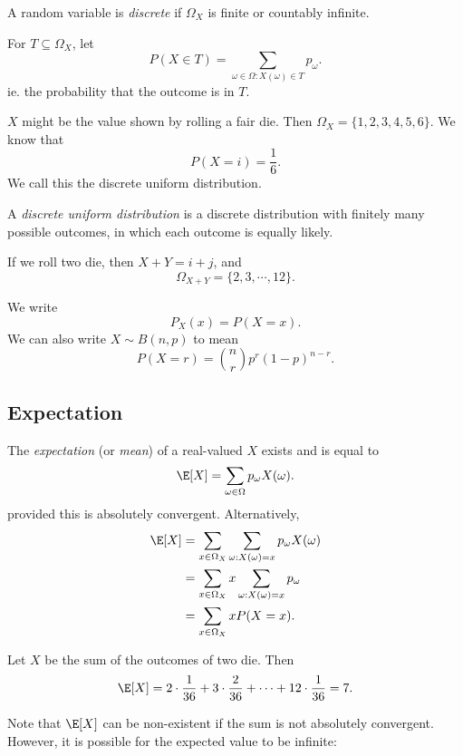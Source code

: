 \documentclass[a4paper]{article}
\begin{document}
\begin{defi}
  A random variable is \emph{discrete} if $\Omega_X$ is finite or countably infinite.
\end{defi}

\begin{notation}
  For $T\subseteq \Omega_X$, let
  \[
    P(X\in T) = \sum_{\omega \in \Omega: X(\omega)\in T}p_\omega.
  \]
  ie. the probability that the outcome is in $T$.
\end{notation}

\begin{eg}
  $X$ might be the value shown by rolling a fair die. Then $\Omega_X = \{1, 2, 3, 4, 5, 6\}$. We know that
  \[
    P(X = i) = \frac{1}{6}.
  \]
  We call this the discrete uniform distribution.
\end{eg}
\begin{defi}
  A \emph{discrete uniform distribution} is a discrete distribution with finitely many possible outcomes, in which each outcome is equally likely.
\end{defi}

\begin{eg}
  If we roll two die, then $X + Y = i + j$, and
  \[
    \Omega_{X + Y} = \{2, 3, \cdots, 12\}.
  \]
\end{eg}

\begin{notation}
  We write
  \[
    P_X(x) = P(X = x).
  \]
  We can also write $X\sim B(n, p)$ to mean
  \[
    P(X = r) = \binom{n}{r}p^r(1 - p)^{n - r}.
  \]
\end{notation}

\subsection{Expectation}
\begin{defi}[Expectation]
  The \emph{expectation} (or \emph{mean}) of a real-valued $X$ exists and is equal to
  \[
    \E[X] = \sum_{\omega\in \Omega}p_\omega X(\omega).
  \]
  provided this is absolutely convergent. Alternatively, 
  \begin{align*} 
    \E[X] &= \sum_{x\in \Omega_X}\sum_{\omega: X(\omega) = x}p_\omega X(\omega)\\
    &= \sum_{x\in \Omega_X}x\sum_{\omega:X(\omega) = x}p_\omega\\
    &= \sum_{x\in \Omega_X}xP(X = x).
  \end{align*}
\end{defi}
\begin{eg}
  Let $X$ be the sum of the outcomes of two die. Then
  \[
    \E[X] = 2\cdot \frac{1}{36} + 3\cdot \frac{2}{36} + \cdots + 12\cdot \frac{1}{36} = 7.
  \]
\end{eg}
Note that $\E[X]$ can be non-existent if the sum is not absolutely convergent. However, it is possible for the expected value to be infinite:
\end{document}
